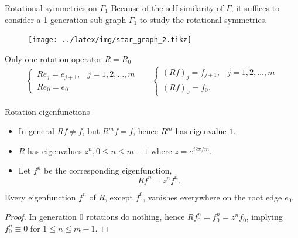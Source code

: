 \documentclass{beamer}
\begin{document}
  \begin{frame}{Rotational symmetries on $\Gamma_1$}
    Because of the self-similarity of $\Gamma$, it suffices to consider a 1-generation sub-graph $\Gamma_1$ to study the rotational symmetries.
    \vspace{-0.5em}
    \begin{figure}
      \centering
      \texttt{[image: ../latex/img/star\_graph\_2.tikz]}
    \end{figure}
    \vspace{-2em}
    Only one rotation operator $R=R_0$
    \begin{align*}
      \begin{cases}
        R e_j = e_{j+1}, & j = 1, 2, \ldots, m \\
        R e_0 = e_{0}
      \end{cases} &&
      \begin{cases}
        (R f)_{j} = f_{j+1}, & j = 1, 2, \ldots, m \\
        (R f)_{0} = f_{0}.
      \end{cases}
    \end{align*}
  \end{frame}

  \begin{frame}{Rotation-eigenfunctions}
    \begin{itemize}
      \item In general $Rf \ne f$, but $R^m f = f$, hence $R^m$ has eigenvalue $1$.
      \item $R$ has eigenvalues $z^n, 0 \le n \le m-1$ where $z = e^{i2\pi/m}$.
      \item Let $f^n$ be the corresponding eigenfunction,
      \[
        Rf^n = z^nf^n.
      \]
    \end{itemize}
    \pause
    \begin{lemma}
      Every eigenfunction $f^n$ of $R$, except $f^0$, vanishes everywhere on the root edge $e_0$.
    \end{lemma}
    \begin{proof}
      In generation 0 rotations do nothing, hence
      $R f^n_0 = f^n_0 = z^n f_0$, implying $f^n_0 \equiv 0$ for $1 \le n \le m-1$.
    \end{proof}
  \end{frame}
\end{document}
